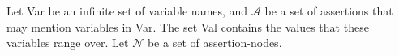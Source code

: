 \documentclass[svgnames]{llncs}
\begin{document}
Let {\sf Var} be an infinite set of variable names, and $\mathcal A$ be a set of assertions that may mention variables in {\sf Var}. The set {\sf Val} contains the values that these variables range over. Let $\mathcal N$ be a set of assertion-nodes.





\end{document}

